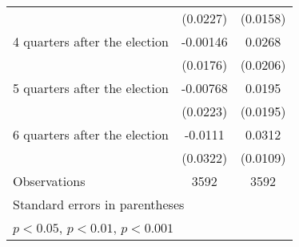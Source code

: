 \begin{table}[htbp]
\begin{tabular}{l*{2}{c}}
                    &    (0.0227)         &    (0.0158)         \\
[1em]
 4 quarters after the election&    -0.00146         &      0.0268         \\
                    &    (0.0176)         &    (0.0206)         \\
[1em]
 5 quarters after the election&    -0.00768         &      0.0195         \\
                    &    (0.0223)         &    (0.0195)         \\
[1em]
 6 quarters after the election&     -0.0111         &      0.0312\sym{**} \\
                    &    (0.0322)         &    (0.0109)         \\
\hline
Observations        &        3592         &        3592         \\
\hline\hline
\multicolumn{3}{l}{\footnotesize Standard errors in parentheses}\\
\multicolumn{3}{l}{\footnotesize \sym{*} \(p<0.05\), \sym{**} \(p<0.01\), \sym{***} \(p<0.001\)}\\
\end{tabular}
\end{table}
